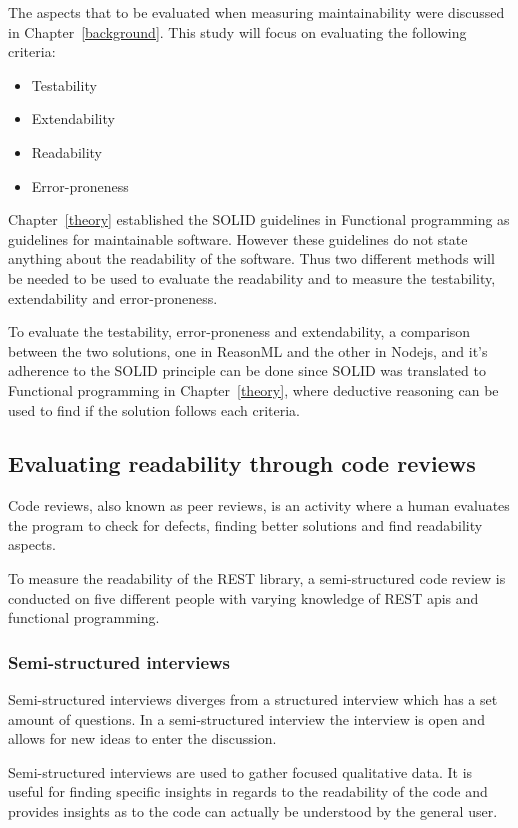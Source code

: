 The aspects that to be evaluated when measuring maintainability were discussed
in Chapter~\ref{background}. This study will focus on evaluating the following
criteria:

\begin{itemize}
    \item Testability
    \item Extendability
    \item Readability
    \item Error-proneness
\end{itemize}

Chapter~\ref{theory} established the SOLID guidelines in Functional programming
as guidelines for maintainable software. However these guidelines do not state
anything about the readability of the software. Thus two different methods will
be needed to be used to evaluate the readability and to measure the testability,
extendability and error-proneness.

To evaluate the testability, error-proneness and extendability, a comparison
between the two solutions, one in ReasonML and the other in Nodejs, and it's
adherence to the SOLID principle can be done since SOLID was translated to
Functional programming in Chapter~\ref{theory}, where deductive reasoning can be
used to find if the solution follows each criteria. 

\subsection{Evaluating readability through code reviews}

Code reviews, also known as peer reviews, is an activity where a human evaluates
the program to check for defects, finding better solutions and find readability
aspects. 

To measure the readability of the REST library, a semi-structured code review is
conducted on five different people with varying knowledge of REST apis and
functional programming.

\subsubsection{Semi-structured interviews}

Semi-structured interviews diverges from a structured interview which has a set
amount of questions. In a semi-structured interview the interview is open and
allows for new ideas to enter the discussion. 

Semi-structured interviews are used to gather focused qualitative data. It is
useful for finding specific insights in regards to the readability of the code
and provides insights as to the code can actually be understood by the general
user.

